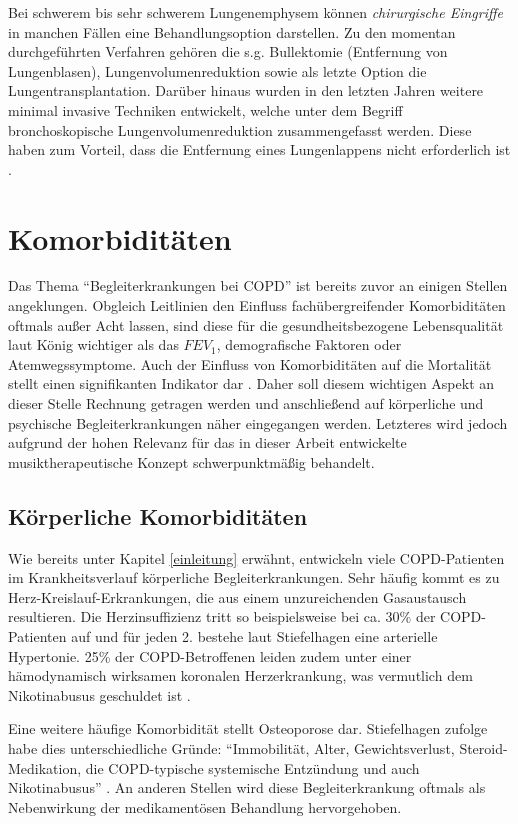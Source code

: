 Bei schwerem bis sehr schwerem Lungenemphysem können \emph{chirurgische Eingriffe} in manchen Fällen eine Behandlungsoption darstellen. Zu den momentan durchgeführten Verfahren gehören die s.g. Bullektomie (Entfernung von Lungenblasen), Lungenvolumenreduktion sowie als letzte Option die Lungentransplantation. Darüber hinaus wurden in den letzten Jahren weitere minimal invasive Techniken entwickelt, welche unter dem Begriff bronchoskopische Lungenvolumenreduktion zusammengefasst werden. Diese haben zum Vorteil, dass die Entfernung eines Lungenlappens nicht erforderlich ist \autocite[vgl.][e23]{vogelmeier2007}.

\section{Komorbiditäten}
\label{komorbiditaeten}
Das Thema "`Begleiterkrankungen bei COPD"' ist bereits zuvor an einigen Stellen angeklungen. Obgleich Leitlinien den Einfluss fachübergreifender Komorbiditäten oftmals außer Acht lassen, sind diese für die gesundheitsbezogene Lebensqualität laut König wichtiger als das $FEV_{1}$, demografische Faktoren oder Atemwegssymptome. Auch der Einfluss von Komorbiditäten auf die Mortalität stellt einen signifikanten Indikator dar \autocite[vgl.][395]{koenig2007}.
Daher soll diesem wichtigen Aspekt an dieser Stelle Rechnung getragen werden und anschließend auf körperliche und psychische Begleiterkrankungen näher eingegangen werden. Letzteres wird jedoch aufgrund der hohen Relevanz für das in dieser Arbeit entwickelte musiktherapeutische Konzept schwerpunktmäßig behandelt.


\subsection{Körperliche Komorbiditäten}
Wie bereits unter Kapitel \ref{einleitung} erwähnt, entwickeln viele COPD-Patienten im Krankheitsverlauf körperliche Begleiterkrankungen. Sehr häufig kommt es zu Herz-Kreislauf-Erkrankungen, die aus einem unzureichenden Gasaustausch resultieren. Die Herzinsuffizienz tritt so beispielsweise bei ca. 30\% der COPD-Patienten auf und für jeden 2. bestehe laut Stiefelhagen eine arterielle Hypertonie. 25\% der COPD-Betroffenen leiden zudem unter einer hämodynamisch wirksamen koronalen Herzerkrankung, was vermutlich dem Nikotinabusus geschuldet ist \autocite[vgl.][37]{stiefelhagen2013}.

Eine weitere häufige Komorbidität stellt Osteoporose dar. Stiefelhagen zufolge habe dies unterschiedliche Gründe: "`Immobilität, Alter, Gewichtsverlust, Steroid-Medikation, die COPD-typische systemische Entzündung und auch Nikotinabusus"' \autocite[37]{stiefelhagen2013}. An anderen Stellen wird diese Begleiterkrankung oftmals als Nebenwirkung der medikamentösen Behandlung hervorgehoben. 

